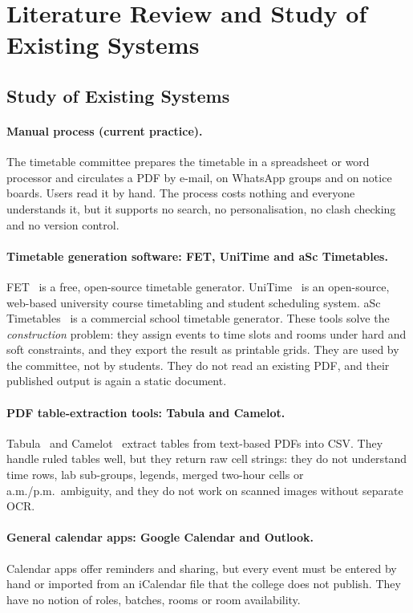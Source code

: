 \section{Literature Review and Study of Existing Systems}

\subsection{Study of Existing Systems}
\paragraph{Manual process (current practice).}
The timetable committee prepares the timetable in a spreadsheet or word processor and circulates a
PDF by e-mail, on WhatsApp groups and on notice boards. Users read it by hand. The process costs
nothing and everyone understands it, but it supports no search, no personalisation, no clash
checking and no version control.

\paragraph{Timetable generation software: FET, UniTime and aSc Timetables.}
FET~\cite{fet} is a free, open-source timetable generator. UniTime~\cite{unitime} is an open-source,
web-based university course timetabling and student scheduling system. aSc Timetables~\cite{asc} is a
commercial school timetable generator. These tools solve the \emph{construction} problem: they
assign events to time slots and rooms under hard and soft constraints, and they export the result
as printable grids. They are used by the committee, not by students. They do not read an existing
PDF, and their published output is again a static document.

\paragraph{PDF table-extraction tools: Tabula and Camelot.}
Tabula~\cite{tabula} and Camelot~\cite{camelot} extract tables from text-based PDFs into CSV. They
handle ruled tables well, but they return raw cell strings: they do not understand time rows, lab
sub-groups, legends, merged two-hour cells or a.m./p.m.\ ambiguity, and they do not work on scanned
images without separate OCR.

\paragraph{General calendar apps: Google Calendar and Outlook.}
Calendar apps offer reminders and sharing, but every event must be entered by hand or imported from
an iCalendar file that the college does not publish. They have no notion of roles, batches,
rooms or room availability.

